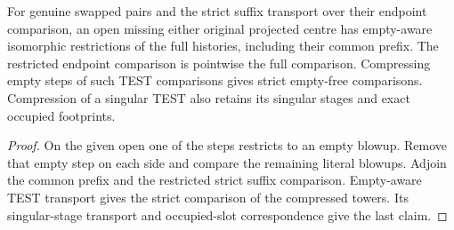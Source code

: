 \begin{proposition}
\label{hir:g8-disjoint-swap-restricted-read}
\leanok
For genuine swapped pairs and the strict suffix transport over their
endpoint comparison, an open missing either original projected
centre has empty-aware isomorphic restrictions of the full histories,
including their common prefix. The restricted endpoint comparison is
pointwise the full comparison. Compressing empty steps of such TEST
comparisons gives strict empty-free comparisons. Compression of a
singular TEST also retains its singular stages and exact occupied
footprints.
\end{proposition}
\begin{proof}
On the given open one of the steps restricts to an empty blowup.
Remove that empty step on each side and compare the remaining
literal blowups. Adjoin the common prefix and the restricted strict
suffix comparison. Empty-aware TEST transport gives the strict
comparison of the compressed towers. Its singular-stage transport
and occupied-slot correspondence give the last claim.
\end{proof}

